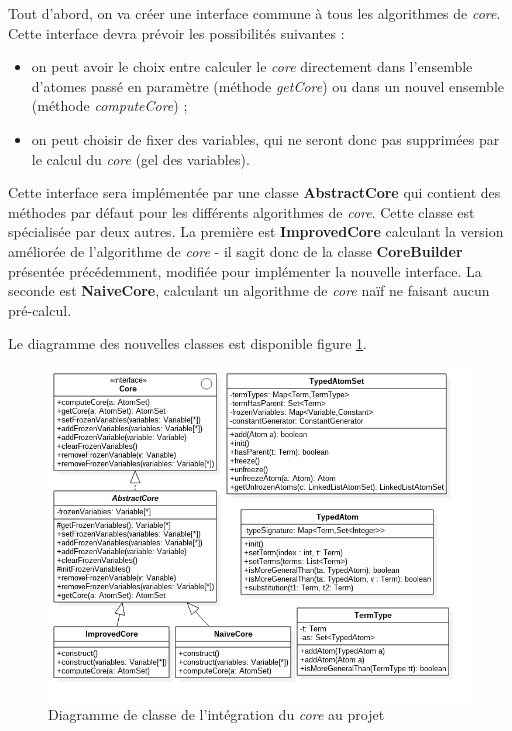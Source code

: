     Tout d'abord, on va créer une interface commune à tous les algorithmes de \textit{core}. Cette interface devra prévoir les possibilités suivantes :
    \begin{itemize}
        \item on peut avoir le choix entre calculer le \textit{core} directement dans l'ensemble d'atomes passé en paramètre (méthode \textit{getCore}) ou dans un nouvel ensemble (méthode \textit{computeCore}) ;
        \item on peut choisir de fixer des variables, qui ne seront donc pas supprimées par le calcul du \textit{core} (gel des variables).
    \end{itemize}
    Cette interface sera implémentée par une classe \textbf{AbstractCore} qui contient des méthodes par défaut pour les différents algorithmes de \textit{core}. Cette classe est spécialisée par deux autres. La première est \textbf{ImprovedCore} calculant la version améliorée de l'algorithme de \textit{core} - il sagit donc de la classe \textbf{CoreBuilder} présentée précédemment, modifiée pour implémenter la nouvelle interface. La seconde est \textbf{NaiveCore}, calculant un algorithme de \textit{core} naïf ne faisant aucun pré-calcul.
    \par Le diagramme des nouvelles classes est disponible figure \ref{fig:dclasse_new_core}.
        \begin{figure}[H]
        \centering
        \vspace{-10pt}
        \includegraphics[width=\textwidth]{pictures/diag_classe_new_core.png}
        \vspace{-35pt}
        \caption{Diagramme de classe de l'intégration du \textit{core} au projet}
        \vspace{-5pt}
        \label{fig:dclasse_new_core}
        \end{figure}
     
